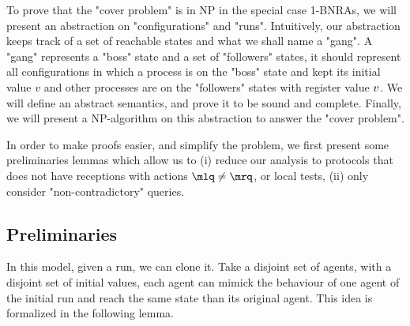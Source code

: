 To prove that the "cover problem" is in NP in the special case 1-BNRAs, we will present an abstraction on "configurations" and "runs". Intuitively, our abstraction keeps track of a set of reachable states and what we shall name a "gang". A "gang" represents a "boss" state and a set of "followers" states, it should represent all configurations in which a process is on the "boss" state and kept its initial value $v$ and other processes are on the "followers" states with register value $v$. We will define an abstract semantics, and prove it to be sound and complete. Finally, we will present a NP-algorithm on this abstraction to answer the "cover problem".

In order to make proofs easier, and simplify the problem, we first present some preliminaries lemmas which allow us to (i) reduce our analysis to protocols that does not have receptions with actions $\quotemarks{\ne}$, or local tests, (ii) only consider "non-contradictory" queries.



\subsection{Preliminaries}







In this model, given a run, we can clone it. Take a disjoint set of agents, with a disjoint set of initial values, each agent can mimick the behaviour of one agent of the initial run and reach the same state than its original agent. This idea is formalized in the following lemma.

